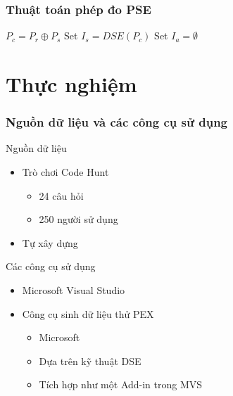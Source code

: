 \documentclass{beamer}
\begin{document}
\begin{frame}
  \frametitle{Thuật toán phép đo PSE}
  \begin{algorithm}[H]
  	$P_c = P_r \oplus P_s$\;
  	Set $I_s = DSE(P_c)$ \;
  	Set $I_a = \emptyset$ \;
  	{  			
  	}
  \end{algorithm}
\end{frame}


\section{Thực nghiệm}

\begin{frame}
  \frametitle{Nguồn dữ liệu và các công cụ sử dụng}
  \begin{block}{Nguồn dữ liệu}
    \begin{itemize}
    \item Trò chơi Code Hunt
      \begin{itemize}
      \item 24 câu hỏi
      \item 250 người sử dụng
      \end{itemize}
    \item Tự xây dựng
    \end{itemize}
  \end{block} \pause
  \begin{block}{Các công cụ sử dụng}
    \begin{itemize}
    \item Microsoft Visual Studio
    \item Công cụ sinh dữ liệu thử PEX
      \begin{itemize}
      \item Microsoft
      \item Dựa trên kỹ thuật DSE
      \item Tích hợp như một Add-in trong MVS
      \end{itemize}
    \end{itemize}
  \end{block}
\end{frame}
\end{document}
